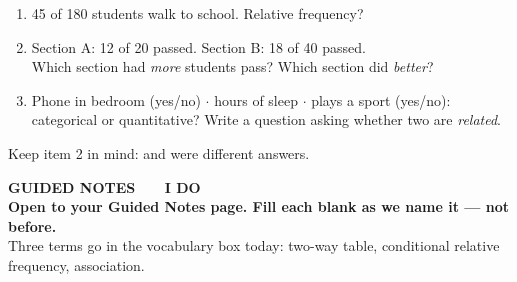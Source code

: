 \documentclass[aspectratio=169, 11pt]{beamer}
\begin{document}
\begin{frame}[t, plain]
  \begin{enumerate}\setlength{\itemsep}{8pt}
    \item 45 of 180 students walk to school. Relative frequency?
    \item Section A: 12 of 20 passed. Section B: 18 of 40 passed. \\
          Which section had \emph{more} students pass? Which section did \emph{better}?
    \item Phone in bedroom (yes/no) $\cdot$ hours of sleep $\cdot$ plays a sport (yes/no): \\
          categorical or quantitative? Write a question asking whether two are
          \emph{related}.
  \end{enumerate}
  \vspace{6pt}
  \begin{center}
    {\small\color{slate} Keep item 2 in mind:  and  were different
    answers.}
  \end{center}
\end{frame}

{
\begin{frame}[plain]
  \vspace{1.8cm}\hspace{0.8cm}%
  \begin{minipage}{0.86\textwidth}
    {\color{goldacc}\bfseries\small GUIDED NOTES \ \textbullet\ \ I DO}\\[0.7cm]
    {\color{white}\bfseries\Large Open to your Guided Notes page. Fill each blank as we
    name it --- not before.}\\[0.9cm]
    {\color{skymid}\small Three terms go in the vocabulary box today: two-way table,
    conditional relative frequency, association.}
  \end{minipage}
\end{frame}
}
\end{document}
